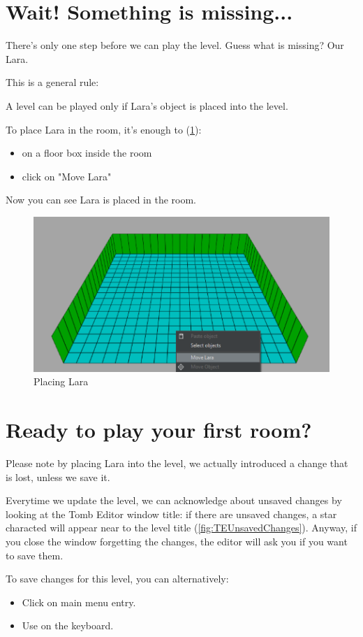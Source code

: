 \section{Wait! Something is missing...}

There's only one step before we can play the level. Guess what is missing? Our Lara.
\par This is a general rule:
\begin{remark}
A level can be played only if Lara's object is placed into the level.
\end{remark}
To place Lara in the room, it's enough to (\ref{fig:temovelara}):
\begin{itemize}
    \item {} on a floor box inside the room
    \item click on "Move Lara"
\end{itemize}
Now you can see Lara is placed in the room.

\begin{figure}
    \centering
     \includegraphics[width=1\textwidth]{screenshots/1001.png}
     \caption{Placing Lara}
     \label{fig:temovelara} 
\end{figure}

\section{Ready to play your first room?}
Please note by placing Lara into the level, we actually introduced a change that is lost, unless we save it.
\par Everytime we update the level, we can acknowledge about unsaved changes by looking at the Tomb Editor window title: if there are unsaved changes, a star characted will appear near to the level title (\ref{fig:TEUnsavedChanges}). Anyway, if you close the window forgetting the changes, the editor will ask you if you want to save them.
\par To save changes for this level, you can alternatively:
\begin{itemize}
    \item Click on  main menu entry.
    \item Use  on the keyboard.
\end{itemize}

